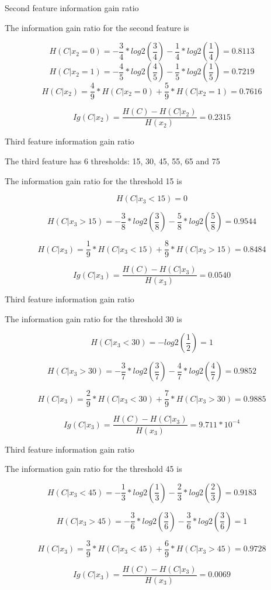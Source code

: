 \begin{frame}{Second feature information gain ratio}
	
	The information gain ratio for the second feature is
	
	\[ 
		H(C|x_2 = 0) = - \frac{3}{4} * log2\left(\frac{3}{4}\right) 
		- \frac{1}{4} * log2\left(\frac{1}{4}\right) = 0.8113
	\]
	\[ 
		H(C|x_2 = 1) = - \frac{4}{5} * log2\left(\frac{4}{5}\right) 
		- \frac{1}{5} * log2\left(\frac{1}{5}\right) = 0.7219
	\]
	\[ 
		H(C|x_2) = \frac{4}{9} * H(C|x_2 = 0) +
		 \frac{5}{9} * H(C|x_2 = 1) = 0.7616
	\]
	
	\[ 
		Ig(C|x_2) = \frac{H(C) - H(C|x_2)}{H(x_2)} = 0.2315
	\]
	
	
\end{frame}

\begin{frame}{Third feature information gain ratio}
	
	The third feature has 6 thresholds: 15, 30, 45, 55, 65 and 75
	
	The information gain ratio for the threshold 15 is
	
	\[ 
		H(C|x_3 < 15) = 0
	\]
	
	\[ 
		H(C|x_3 > 15) = - \frac{3}{8} * log2\left(\frac{3}{8}\right) 
		- \frac{5}{8} * log2\left(\frac{5}{8}\right) = 0.9544
	\]
	
	\[ 
		H(C|x_3) = \frac{1}{9} * H(C|x_3 < 15) + \frac{8}{9} * H(C|x_3 > 15) 	= 0.8484
	\]
	
	\[ 
		Ig(C|x_3) = \frac{H(C) - H(C|x_3)}{H(x_3)} = 0.0540
	\]

\end{frame}

\begin{frame}{Third feature information gain ratio}
	
	The information gain ratio for the threshold 30 is
	
	\[ 
		H(C|x_3 < 30) = - log2\left(\frac{1}{2}\right) = 1
	\]
	
	\[ 
		H(C|x_3 > 30) = - \frac{3}{7} * log2\left(\frac{3}{7}\right) 
		- \frac{4}{7} * log2\left(\frac{4}{7}\right) = 0.9852
	\]
	
	\[ 
		H(C|x_3) = \frac{2}{9} * H(C|x_3 < 30) + \frac{7}{9} * H(C|x_3 > 30) 		= 0.9885
	\]
	
	\[ 
		Ig(C|x_3) = \frac{H(C) - H(C|x_3)}{H(x_3)} = 9.711 * 10^{-4}
	\]
\end{frame}

\begin{frame}{Third feature information gain ratio}
	
	The information gain ratio for the threshold 45 is
	
	\[ 
		H(C|x_3 < 45)  = - \frac{1}{3} * log2\left(\frac{1}{3}\right) 
		 - \frac{2}{3} * log2\left(\frac{2}{3}\right) = 0.9183
	\]
	
	\[ 
		H(C|x_3 > 45) = - \frac{3}{6} * log2\left(\frac{3}{6}\right) 
		- \frac{3}{6} * log2\left(\frac{3}{6}\right) = 1
	\]
	
	\[ 
		H(C|x_3) = \frac{3}{9} * H(C|x_3 < 45) + \frac{6}{9} * H(C|x_3 > 45) 		= 0.9728
	\]
	
	\[ 
		Ig(C|x_3) = \frac{H(C) - H(C|x_3)}{H(x_3)} = 0.0069
	\]
\end{frame}

